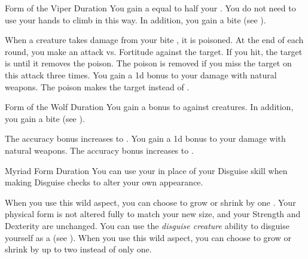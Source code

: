 {            \begin{durationability}{Form of the Viper}
                Duration
                \rankline
                You gain a  equal to half your .
                You do not need to use your hands to climb in this way.
                In addition, you gain a bite  (see ).

                \rankline
                 When a creature takes damage from your bite , it is poisoned.
                At the end of each round, you make an attack vs. Fortitude against the target.
                If you hit, the target is \sickened until it removes the poison.
                The poison is removed if you miss the target on this attack three times.
                 You gain a \plus1d bonus to your damage with natural weapons.
                 The poison makes the target \nauseated instead of \sickened.
            \end{durationability}

            \begin{durationability}{Form of the Wolf}
                Duration
                \rankline
                You gain a  bonus to  against \surrounded creatures.
                In addition, you gain a bite  (see ).

                \rankline
                 The accuracy bonus increases to .
                 You gain a \plus1d bonus to your damage with natural weapons.
                 The accuracy bonus increases to .
            \end{durationability}

            \begin{durationability}{Myriad Form}
                Duration
                \rankline
                You can use your  in place of your Disguise skill when making Disguise checks to alter your own appearance.

                \rankline
                 When you use this wild aspect, you can choose to grow or shrink by one .
                    Your physical form is not altered fully to match your new size, and your Strength and Dexterity are unchanged.
                 You can use the \textit{disguise creature} ability to disguise yourself as a  (see ).
                 When you use this wild aspect, you can choose to grow or shrink by up to two  instead of only one.
            \end{durationability}

}
